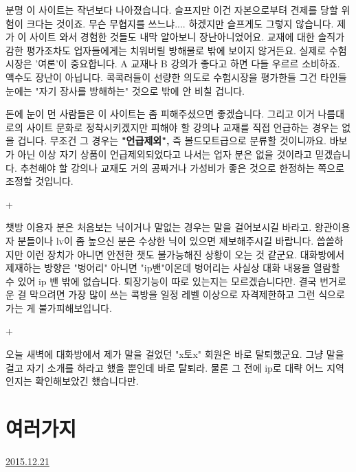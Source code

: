 분명 이 사이트는 작년보다 나아졌습니다.
슬프지만 이건 자본으로부텨 견제를 당할 위험이 크다는 것이죠.
무슨 무협지를 쓰느냐.... 하겠지만 슬프게도 그렇지 않습니다. 제가 이 사이트 와서 경험한 것들도 내막 알아보니 장난아니었어요.
교재에 대한 솔직가감한 평가조차도 업자들에게는 치워버릴 방해물로 밖에 보이지 않거든요.
실제로 수험시장은 '여론'이 중요합니다. A 교재나 B 강의가 좋다고 하면 다들 우르르 소비하죠. 액수도 장난이 아닙니다.
콕콕러들이 선량한 의도로 수험시장을 평가한들 그건 타인들 눈에는 "자기 장사를 방해하는" 것으로 밖에 안 비칠 겁니다.
\vspace{5mm}

돈에 눈이 먼 사람들은 이 사이트는 좀 피해주셨으면 좋겠습니다.
그리고 이거 나름대로의 사이트 문화로 정착시키겠지만
피해야 할 강의나 교재를 직접 언급하는 경우는 없을 겁니다. 무조건 그 경우는 \textbf{"언급제외",} 즉 볼드모트급으로 분류할 것이니까요.
바보가 아닌 이상 자기 상품이 언급제외되었다고 나서는 업자 분은 없을 것이라고 믿겠습니다.
추천해야 할 강의나 교재도 거의 공짜거나 가성비가 좋은 것으로 한정하는 쪽으로 조정할 것입니다.
\vspace{5mm}

+
\vspace{5mm}

챗방 이용자 분은 처음보는 닉이거나 말없는 경우는 말을 걸어보시길 바라고.
왕관이용자 분들이나 lv이 좀 높으신 분은 수상한 닉이 있으면 제보해주시길 바랍니다.
씁쓸하지만 이런 장치가 아니면 안전한 챗도 불가능해진 상황이 오는 것 같군요.
대화방에서 제재하는 방향은 "벙어리" 아니면 "ip밴"이온데
벙어리는 사실상 대화 내용을 열람할 수 있어 ip 밴 밖에 없습니다. 퇴장기능이 따로 있는지는 모르겠습니다만.
결국 번거로운 걸 막으려면 가장 많이 쓰는 콕방을 일정 레벨 이상으로 자격제한하고 그런 식으로 가는 게 불가피해보입니다.
\vspace{5mm}

+
\vspace{5mm}

오늘 새벽에 대화방에서 제가 말을 걸었던 "x토x" 회원은 바로 탈퇴했군요.
그냥 말을 걸고 자기 소개를 하라고 했을 뿐인데 바로 탈퇴라.
물론 그 전에 ip로 대략 어느 지역인지는 확인해보았긴 했습니다만.
\vspace{5mm}






\section{여러가지}
\href{https://www.kockoc.com/Apoc/556008}{2015.12.21}

